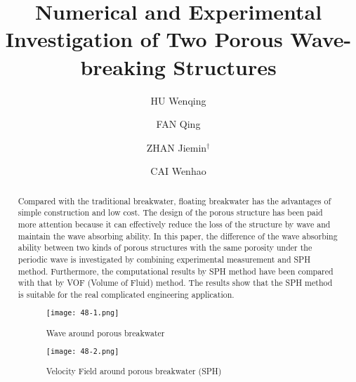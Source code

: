 \documentclass[10pt]{article}
\title{Numerical and Experimental Investigation of Two Porous Wave-breaking Structures}
\date{}
\author[$\relax$]{HU Wenqing}
\author[$\relax$]{FAN Qing}
\author[$\relax$]{ZHAN Jiemin$^\dagger$}
\author[$\relax$]{CAI Wenhao}
\affil[$\relax$]{Sun Yat-sen University, Guangzhou, China}
\affil[$\relax$]{\email{\dagger}{stszjm@mail.sysu.edu.cn}}
\begin{document}
\maketitle


\begin{abstract}
Compared with the traditional breakwater, floating breakwater has the advantages of simple construction and low cost. The design of the porous structure has been paid more attention because it can effectively reduce the loss of the structure by wave and maintain the wave absorbing ability. In this paper, the difference of the wave absorbing ability between two kinds of porous structures with the same porosity under the periodic wave is investigated by combining experimental measurement and SPH method. Furthermore, the computational results by SPH method have been compared with that by VOF (Volume of Fluid) method. The results show that the SPH method is suitable for the real complicated engineering application.

\begin{figure}[!htb]
\centering
\texttt{[image: 48-1.png]}
\caption{Wave around porous breakwater}\label{fig:48-1}
\end{figure}

\begin{figure}[!htb]
\centering
\texttt{[image: 48-2.png]}
\caption{Velocity Field around porous breakwater (SPH)}\label{fig:48-2}
\end{figure}

\end{abstract}



\end{document}
